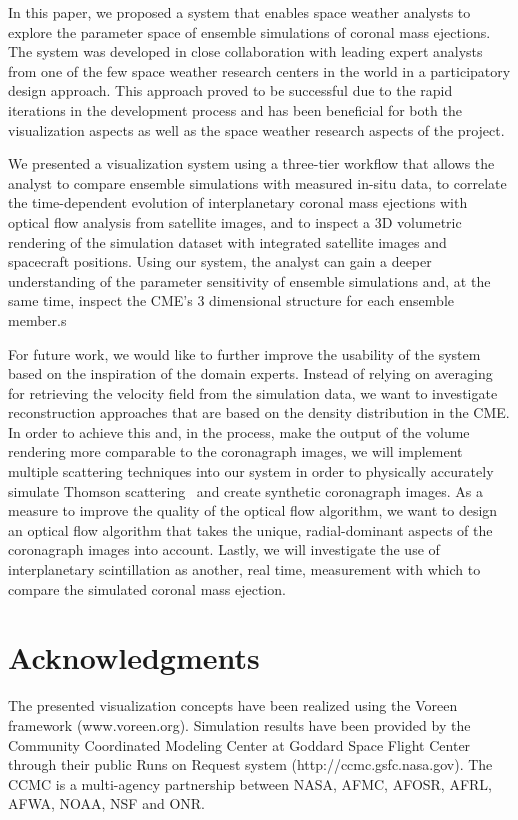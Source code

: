 \documentclass[journal]{vgtc}                %
\begin{document}
In this paper, we proposed a system that enables space weather analysts to explore the parameter space of ensemble simulations of coronal mass ejections. The system was developed in close collaboration with leading expert analysts from one of the few space weather research centers in the world in a participatory design approach. This approach proved to be successful due to the rapid iterations in the development process and has been beneficial for both the visualization aspects as well as the space weather research aspects of the project.

We presented a visualization system using a three-tier workflow that allows the analyst to compare ensemble simulations with measured in-situ data, to correlate the time-dependent evolution of interplanetary coronal mass ejections with optical flow analysis from satellite images, and to inspect a 3D volumetric rendering of the simulation dataset with integrated satellite images and spacecraft positions. Using our system, the analyst can gain a deeper understanding of the parameter sensitivity of ensemble simulations and, at the same time, inspect the CME's 3 dimensional structure for each ensemble member.s

For future work, we would like to further improve the usability of the system based on the inspiration of the domain experts. Instead of relying on averaging for retrieving the velocity field from the simulation data, we want to investigate reconstruction approaches that are based on the density distribution in the CME. In order to achieve this and, in the process, make the output of the volume rendering more comparable to the coronagraph images, we will implement multiple scattering techniques into our system in order to physically accurately simulate Thomson scattering~\cite{howard2012thomson} and create synthetic coronagraph images. As a measure to improve the quality of the optical flow algorithm, we want to design an optical flow algorithm that takes the unique, radial-dominant aspects of the coronagraph images into account. Lastly, we will investigate the use of interplanetary scintillation as another, real time, measurement with which to compare the simulated coronal mass ejection.

\section*{Acknowledgments}
The presented visualization concepts have been realized using the Voreen framework (www.voreen.org). Simulation results have been provided by the Community Coordinated Modeling Center at Goddard Space Flight Center through their public Runs on Request system (http://ccmc.gsfc.nasa.gov). The CCMC is a multi-agency partnership between NASA, AFMC, AFOSR, AFRL, AFWA, NOAA, NSF and ONR.



\end{document}

